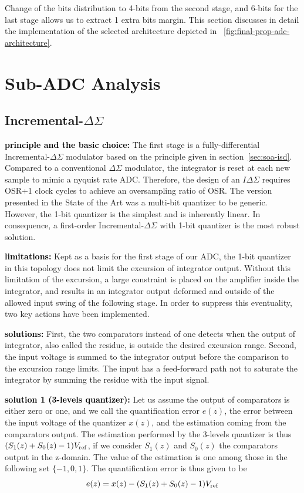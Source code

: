 Change of the bits distribution to 4-bits from the second stage, and 6-bits for the last stage allows us to extract 1 extra bits margin. This section discusses in detail the implementation of the selected architecture depicted in \figurename~\ref{fig:final-prop-adc-architecture}.

\section{Sub-ADC Analysis}
\subsection{Incremental-\(\Delta\Sigma \)} %

\textbf{\textcolor{black}{principle and the basic choice:}}
The first stage is a fully-differential Incremental-\(\Delta\Sigma \) modulator based on the principle given in section~\ref{sec:soa-isd}.
Compared to a conventional $\Delta\Sigma$ modulator, the integrator is reset at each new sample to mimic a nyquist rate ADC\@. Therefore, the design of an \(I\Delta\Sigma \) requires OSR+1 clock cycles to achieve an oversampling ratio of OSR\@. The version presented in the State of the Art was a multi-bit quantizer to be generic. However, the 1-bit quantizer is the simplest and is inherently linear. In consequence, a first-order Incremental-$\Delta\Sigma$ with 1-bit quantizer is the most robust solution.

\textbf{\textcolor{black}{limitations:}}
Kept as a basis for the first stage of our ADC, the 1-bit quantizer in this topology does not limit the excursion of integrator output. Without this limitation of the excursion, a large constraint is placed on the amplifier inside the integrator, and results in an integrator output deformed and outside of the allowed input swing of the following stage. In order to suppress this eventuality, two key actions have been implemented.

\textbf{\textcolor{black}{solutions:}}
First, the two comparators instead of one detects when the output of integrator, also called the residue, is outside the desired excursion range. Second, the input voltage is summed to the integrator output before the comparison to the excursion range limits. The input has a feed-forward path not to saturate the integrator by summing the residue with the input signal.

\textbf{\textcolor{black}{solution 1 (3-levels quantizer):}}
Let us assume the output of comparators is either zero or one, and we call the quantification error $e(z)$, the error between the input voltage of the quantizer $x(z)$, and the estimation coming from the comparators output. The estimation performed by the 3-levels quantizer is thus \((S_1(z)+S_0(z)-1)V_{\rm ref} \), if we consider $S_1(z)$ and $S_0(z)$ the comparators output in the z-domain. The value of the estimation is one among those in the following set \(\{-1,0,1\}\). The quantification error is thus given to be
\begin{equation} 
	e(z) = x(z) - (S_1(z)+S_0(z)-1)V_{\rm ref}
\end{equation}

